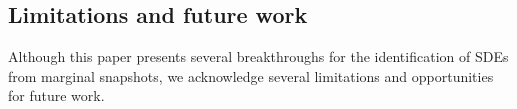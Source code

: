 \documentclass[twoside,11pt]{article}
\newcommand{\rv}[1]{\textcolor{black}{#1}}
\begin{document}


\subsection{Limitations and future work}
Although this paper presents several breakthroughs for the identification of SDEs from marginal snapshots, we acknowledge several limitations and opportunities for future work. 

\end{document}
